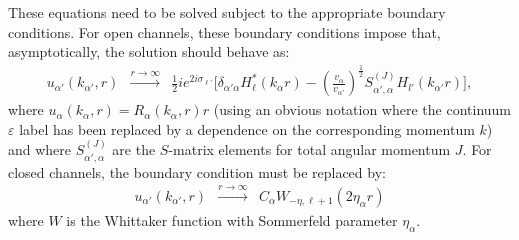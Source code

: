 \documentclass[preprint,12pt]{elsarticle}
\begin{document}
These equations need to be solved subject to the appropriate boundary conditions. For open channels, 
these boundary conditions impose that, asymptotically, the solution should behave as:
\begin{eqnarray}
\label{wfasym}
u_{\alpha'}({k_{\alpha'}}, {r}) & \xrightarrow{r\rightarrow\infty} &   
 \frac{1}{2}i e^{2i\sigma_{\ell'}} \Big[ \delta_{\alpha' \alpha} H_{\ell}^{*}(k_{\alpha} r)
- \left( \frac{v_{\alpha}}{v_{\alpha'}}\right)^{\frac{1}{2}}
S^{(J)}_{\alpha',\alpha}H_{l'}(k_{\alpha'}r) \Big] ,  
\end{eqnarray}
where $u_\alpha(k_\alpha,r)= R_\alpha(k_\alpha,r) r$ (using an obvious
notation where the continuum $\varepsilon$ label has been replaced by
a dependence on the corresponding momentum $k$) and 
where $S^{(J)}_{\alpha',\alpha}$ are the $S$-matrix elements for total angular momentum $J$. For closed channels, the boundary condition must be replaced by:
\begin{eqnarray}
\label{wfasym2}
u_{\alpha'}({k_{\alpha'}}, {r}) & \xrightarrow{r\rightarrow\infty}
 & C_{\alpha} W_{-\eta,\ell +1}( 2 \eta_{\alpha}r)
\end{eqnarray}
where $W$ is the Whittaker function with Sommerfeld parameter $\eta_{\alpha}$.
\end{document}
